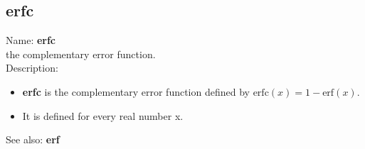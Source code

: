 \subsection{ erfc }
\noindent Name: \textbf{erfc}\\
the complementary error function.\\

\noindent Description: \begin{itemize}

\item \textbf{erfc} is the complementary error function defined by $\mathrm{erfc}(x) = 1 - \mathrm{erf}(x)$.

\item It is defined for every real number x.
\end{itemize}
See also: \textbf{erf}
